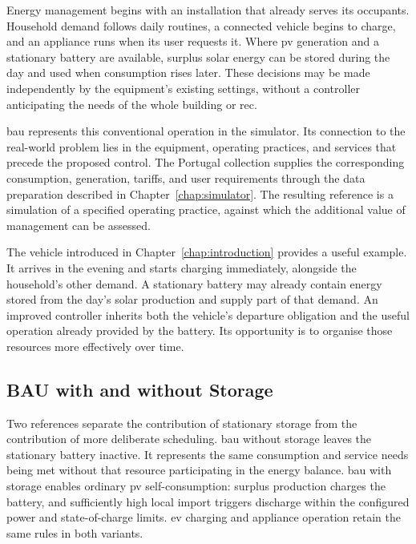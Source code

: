 Energy management begins with an installation that already serves its occupants. Household demand follows daily routines, a connected vehicle begins to charge, and an appliance runs when its user requests it. Where \gls{pv} generation and a stationary battery are available, surplus solar energy can be stored during the day and used when consumption rises later. These decisions may be made independently by the equipment's existing settings, without a controller anticipating the needs of the whole building or \gls{rec}.

\gls{bau} represents this conventional operation in the simulator. Its connection to the real-world problem lies in the equipment, operating practices, and services that precede the proposed control. The Portugal collection supplies the corresponding consumption, generation, tariffs, and user requirements through the data preparation described in Chapter~\ref{chap:simulator}. The resulting reference is a simulation of a specified operating practice, against which the additional value of management can be assessed.

The vehicle introduced in Chapter~\ref{chap:introduction} provides a useful example. It arrives in the evening and starts charging immediately, alongside the household's other demand. A stationary battery may already contain energy stored from the day's solar production and supply part of that demand. An improved controller inherits both the vehicle's departure obligation and the useful operation already provided by the battery. Its opportunity is to organise those resources more effectively over time.

\subsection{BAU with and without Storage}
\label{sec:control-bau-variants}

Two references separate the contribution of stationary storage from the contribution of more deliberate scheduling. \gls{bau} without storage leaves the stationary battery inactive. It represents the same consumption and service needs being met without that resource participating in the energy balance. \gls{bau} with storage enables ordinary \gls{pv} self-consumption: surplus production charges the battery, and sufficiently high local import triggers discharge within the configured power and state-of-charge limits. \gls{ev} charging and appliance operation retain the same rules in both variants.

